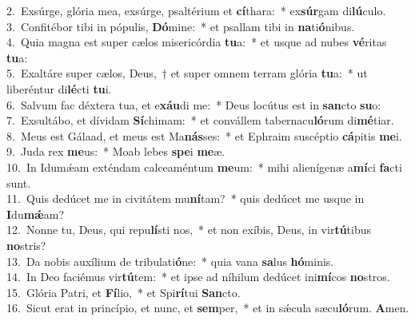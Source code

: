 {2.~}Exsúrge, glória mea, exsúrge, psaltérium et \textbf{cí}thara:~* ex\textbf{súr}gam di\textbf{lú}culo.\\
{3.~}Confitébor tibi in pópulis, \textbf{Dó}mine:~* et psallam tibi in \textbf{na}ti\textbf{ó}nibus.\\
{4.~}Quia magna est super cælos misericórdia \textbf{tu}a:~* et usque ad nubes \textbf{vé}ritas \textbf{tu}a:\\
{5.~}Exaltáre super cælos, Deus,~† et super omnem terram glória \textbf{tu}a:~* ut liberéntur di\textbf{lé}cti \textbf{tu}i.\\
{6.~}Salvum fac déxtera tua, et e\textbf{xáu}di me:~* Deus locútus est in \textbf{san}cto \textbf{su}o:\\
{7.~}Exsultábo, et dívidam \textbf{Sí}chimam:~* et convállem tabernacu\textbf{ló}rum di\textbf{mé}tiar.\\
{8.~}Meus est Gálaad, et meus est Ma\textbf{nás}ses:~* et Ephraim suscéptio \textbf{cá}pitis \textbf{me}i.\\
{9.~}Juda rex \textbf{me}us:~* Moab lebes \textbf{spe}i \textbf{me}æ.\\
{10.~}In Idumǽam exténdam calceaméntum \textbf{me}um:~* mihi alienígenæ a\textbf{mí}ci \textbf{fa}cti sunt.\\
{11.~}Quis dedúcet me in civitátem mu\textbf{ní}tam?~* quis dedúcet me usque in \textbf{I}du\textbf{mǽ}am?\\
{12.~}Nonne tu, Deus, qui repu\textbf{lí}sti nos,~* et non exíbis, Deus, in vir\textbf{tú}tibus \textbf{no}stris?\\
{13.~}Da nobis auxílium de tribulati\textbf{ó}ne:~* quia vana \textbf{sa}lus \textbf{hó}minis.\\
{14.~}In Deo faciémus vir\textbf{tú}tem:~* et ipse ad níhilum dedúcet ini\textbf{mí}cos \textbf{no}stros.\\
{15.~}Glória Patri, et \textbf{Fí}lio,~* et Spi\textbf{rí}tui \textbf{San}cto.\\
{16.~}Sicut erat in princípio, et nunc, et \textbf{sem}per,~* et in sǽcula sæcu\textbf{ló}rum. \textbf{A}men.\\
